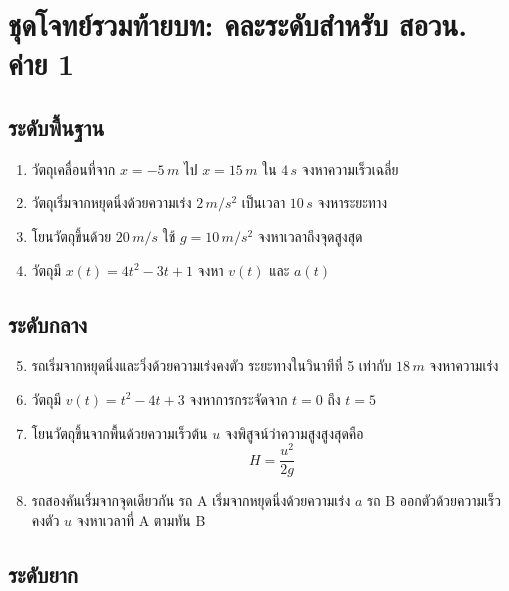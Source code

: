 \documentclass[12pt,a4paper]{report}
\begin{document}
\section{ชุดโจทย์รวมท้ายบท: คละระดับสำหรับ สอวน. ค่าย 1}

\subsection*{ระดับพื้นฐาน}

\begin{enumerate}
    \item วัตถุเคลื่อนที่จาก $x=-5\,\si{m}$ ไป $x=15\,\si{m}$ ใน $4\,\si{s}$ จงหาความเร็วเฉลี่ย
    \item วัตถุเริ่มจากหยุดนิ่งด้วยความเร่ง $2\,\si{m/s^2}$ เป็นเวลา $10\,\si{s}$ จงหาระยะทาง
    \item โยนวัตถุขึ้นด้วย $20\,\si{m/s}$ ใช้ $g=10\,\si{m/s^2}$ จงหาเวลาถึงจุดสูงสุด
    \item วัตถุมี $x(t)=4t^2-3t+1$ จงหา $v(t)$ และ $a(t)$
\end{enumerate}

\subsection*{ระดับกลาง}

\begin{enumerate}
    \setcounter{enumi}{4}
    \item รถเริ่มจากหยุดนิ่งและวิ่งด้วยความเร่งคงตัว ระยะทางในวินาทีที่ 5 เท่ากับ $18\,\si{m}$ จงหาความเร่ง
    \item วัตถุมี $v(t)=t^2-4t+3$ จงหาการกระจัดจาก $t=0$ ถึง $t=5$
    \item โยนวัตถุขึ้นจากพื้นด้วยความเร็วต้น $u$ จงพิสูจน์ว่าความสูงสูงสุดคือ
    \[
    H=\frac{u^2}{2g}
    \]
    \item รถสองคันเริ่มจากจุดเดียวกัน รถ A เริ่มจากหยุดนิ่งด้วยความเร่ง $a$ รถ B ออกตัวด้วยความเร็วคงตัว $u$ จงหาเวลาที่ A ตามทัน B
\end{enumerate}

\subsection*{ระดับยาก}
\end{document}
